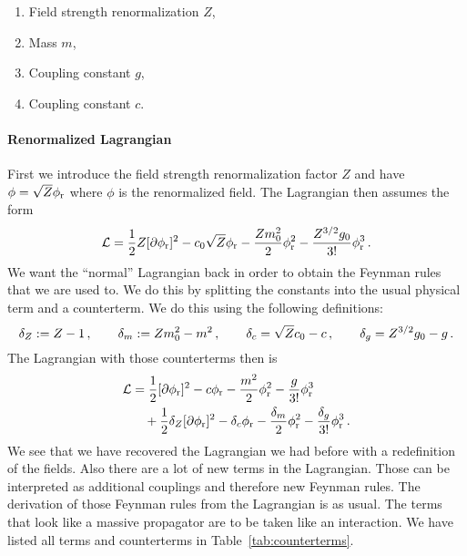 \documentclass[11pt, english, fleqn, DIV=15, headinclude]{scrartcl}
\begin{document}
\begin{enumerate}
    \item Field strength renormalization $Z$,
    \item Mass $m$,
    \item Coupling constant $g$,
    \item Coupling constant $c$.
\end{enumerate}

\paragraph{Renormalized Lagrangian}

\newcommand\phir{\phi_\text r}

First we introduce the field strength renormalization factor $Z$ and have $\phi
= \sqrt Z \phir$ where $\phi$ is the renormalized field. The Lagrangian then
assumes the form
\[
    \mathcal L
    = \frac12 Z [\partial \phir]^2 - c_0 \sqrt Z \phir - \frac{Z m_0^2}2\phir^2
    - \frac{Z^{3/2} g_0}{3!} \phir^3 \,.
\]
We want the \enquote{normal} Lagrangian back in order to obtain the Feynman
rules that we are used to. We do this by splitting the constants into the usual
physical term and a counterterm. We do this using the following definitions:
\[
    \delta_Z := Z - 1
    \,,\qquad
    \delta_m := Z m_0^2 - m^2
    \,,\qquad
    \delta_c = \sqrt Z c_0 - c
    \,,\qquad
    \delta_g = Z^{3/2} g_0 - g
    \,.
\]
The Lagrangian with those counterterms then is
\[
    \begin{split}
    \mathcal L
    &= \frac12 [\partial \phir]^2 - c \phir - \frac{m^2}2\phir^2
    - \frac{g}{3!} \phir^3 \\
    &\quad+ \frac12 \delta_Z [\partial \phir]^2 - \delta_c \phir - \frac{\delta_m}2\phir^2
    - \frac{\delta_g}{3!} \phir^3 \,.
    \end{split}
\]
We see that we have recovered the Lagrangian we had before with a redefinition
of the fields. Also there are a lot of new terms in the Lagrangian. Those can
be interpreted as additional couplings and therefore new Feynman rules. The
derivation of those Feynman rules from the Lagrangian is as usual. The terms
that look like a massive propagator are to be taken like an interaction. We
have listed all terms and counterterms in Table~\ref{tab:counterterms}.
\end{document}
